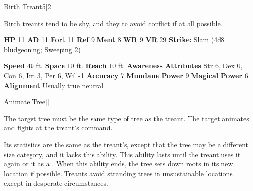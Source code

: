       
  \begin{monsubsection}{Birth Treant}{5}[2]
    \vspace{-1em}\vspace{-1em}
    \vspace{0em}

    
        Birch treants tend to be shy, and they to avoid conflict if at all possible.
      
    

    \begin{spellcontent}
      \begin{spelltargetinginfo}
        \pari \textbf{HP} 11 \monsep
          \textbf{AD} 11 \monsep
          \textbf{Fort} 11 \monsep
          \textbf{Ref} 9 \monsep
          \textbf{Ment} 8
        \pari \textbf{WR} 9 \monsep
        \textbf{VR} 29
        \pari \textbf{Strike:}
            Slam  (4d8 bludgeoning; Sweeping 2)
      \end{spelltargetinginfo}
    \end{spellcontent}
    \begin{monsterfooter}
      \pari \textbf{Speed} 40 ft. \monsep
        \textbf{Space} 10 ft. \monsep
        \textbf{Reach} 10 ft.
      \pari \textbf{Awareness} 
      \pari \textbf{Attributes}
        Str 6, Dex 0,
        Con 6, Int 3,
        Per 6, Wil -1
      \pari \textbf{Accuracy} 7 \monsep
        \textbf{Mundane Power} 9 \monsep
      \textbf{Magical Power} 6
      \pari \textbf{Alignment} Usually true neutral
    \end{monsterfooter}
  \end{monsubsection}
  \begin{freeability}{Animate Tree}[]
      
        The target tree must be the same type of tree as the treant.
        The target animates and fights at the treant's command.

        Its statistics are the same as the treant's, except that the tree may be a different size category, and it lacks this ability.
        This ability lasts until the treant uses it again or  it as a .
        When this ability ends, the tree sets down roots in its new location if possible.
        Treants avoid stranding trees in unsustainable locations except in desperate circumstances.
      
    \end{freeability}
  
